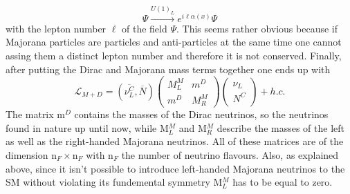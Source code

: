 \begin{equation}
	\Psi\overset{U(1)_L}{\longrightarrow}e^{i\ell\alpha(x)}\Psi
\end{equation}
with the lepton number $\ell$ of the field $\Psi$.
This seems rather obvious because if Majorana particles are particles and anti-particles at the same time one cannot assing them a distinct lepton number and therefore it is not conserved. \newline
Finally, after putting the Dirac and Majorana mass terms together one ends up with \cite[p. 21]{Taanila:2008}
\begin{equation}
	\mathcal{L}_{M+D}=\left(\overline{\nu^C_L},\overline{N}\right)	\left(\begin{array}{cc}M^M_L&m^D\\m^D&M^M_R\end{array}\right)	\left(\begin{array}{c}\nu_L\\N^C\end{array}\right)+h.c.
	\label{eq_majorana_dirac}
\end{equation}
The matrix m$^D$ contains the masses of the Dirac neutrinos, so the neutrinos found in nature up until now, while M$^M_L$ and M$^M_R$ describe the masses of the left as well as the right-handed Majorana neutrinos. All of these matrices are of the dimension n$_F\times$n$_F$ with n$_F$ the number of neutrino flavours. Also, as explained above, since it isn't possible to introduce left-handed Majorana neutrinos to the SM without violating its fundemental symmetry M$^M_L$ has to be equal to zero.
